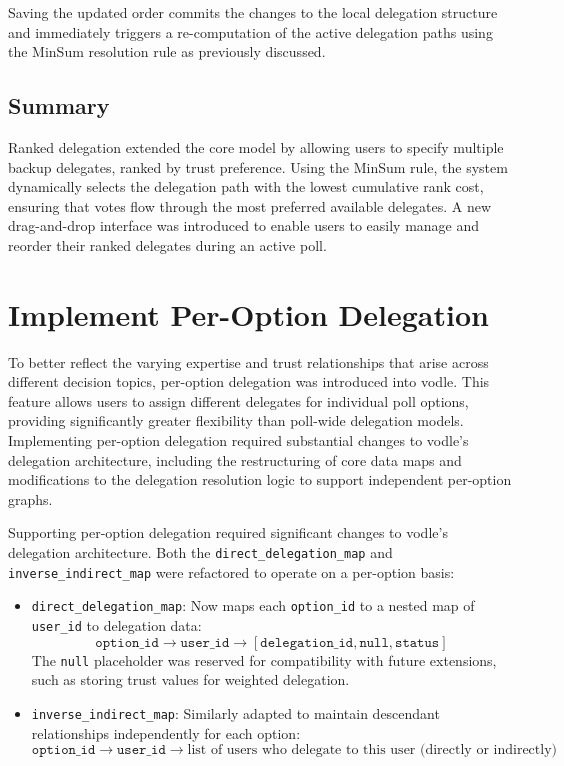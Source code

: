 Saving the updated order commits the changes to the local delegation structure and immediately triggers a re-computation of the active delegation paths using the MinSum resolution rule as previously discussed.

\subsection{Summary}

Ranked delegation extended the core model by allowing users to specify multiple backup delegates, ranked by trust preference. Using the MinSum rule, the system dynamically selects the delegation path with the lowest cumulative rank cost, ensuring that votes flow through the most preferred available delegates. A new drag-and-drop interface was introduced to enable users to easily manage and reorder their ranked delegates during an active poll.

\section{Implement Per-Option Delegation}
\label{sec:design_per_option_delegation}

To better reflect the varying expertise and trust relationships that arise across different decision topics, per-option delegation was introduced into vodle. This feature allows users to assign different delegates for individual poll options, providing significantly greater flexibility than poll-wide delegation models. Implementing per-option delegation required substantial changes to vodle's delegation architecture, including the restructuring of core data maps and modifications to the delegation resolution logic to support independent per-option graphs.

Supporting per-option delegation required significant changes to vodle's delegation architecture. Both the \texttt{direct\_delegation\_map} and \texttt{inverse\_indirect\_map} were refactored to operate on a per-option basis:

\begin{itemize}
  \item \texttt{direct\_delegation\_map}: Now maps each \texttt{option\_id} to a nested map of \texttt{user\_id} to delegation data:
  \[
    \texttt{option\_id} \rightarrow \texttt{user\_id} \rightarrow [\texttt{delegation\_id}, \texttt{null}, \texttt{status}]
  \]
  The \texttt{null} placeholder was reserved for compatibility with future extensions, such as storing trust values for weighted delegation.

  \item \texttt{inverse\_indirect\_map}: Similarly adapted to maintain descendant relationships independently for each option:
  \[
    \texttt{option\_id} \rightarrow \texttt{user\_id} \rightarrow \text{list of users who delegate to this user (directly or indirectly)}
  \]
\end{itemize}

